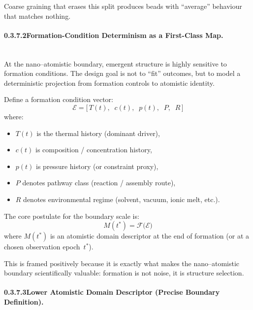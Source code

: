 \documentclass[11pt, a4paper, oneside]{article}
\theoremstyle{definition}
\theoremstyle{remark}
\begin{document}
\noindent
Coarse graining that erases this split produces beads with
``average'' behaviour that matches nothing.

\paragraph{0.3.7.2\quad Formation-Condition Determinism as a
  First-Class Map.}
\label{sec:formation-determinism}
\mbox{}\\[0.4em]

At the nano–atomistic boundary, emergent structure is highly sensitive to
formation conditions.  The design goal is not to ``fit'' outcomes,
but to model a deterministic projection from formation controls to
atomistic identity.

Define a formation condition vector:
\begin{equation}
  \mathcal{E} =
  \bigl[\,
    T(t),\;\;
    c(t),\;\;
    p(t),\;\;
    P,\;\;
    R
  \,\bigr]
  \label{eq:formation-conditions}
\end{equation}
where:
\begin{itemize}
  \item $T(t)$ is the thermal history (dominant driver),
  \item $c(t)$ is composition / concentration history,
  \item $p(t)$ is pressure history (or constraint proxy),
  \item $P$ denotes pathway class (reaction / assembly route),
  \item $R$ denotes environmental regime (solvent, vacuum, ionic
        melt, etc.).
\end{itemize}

The core postulate for the boundary scale is:
\begin{equation}
  \boxed{\;
    M(t^{*}) = \mathcal{F}\!\bigl(\mathcal{E}\bigr)
  \;}
  \label{eq:formation-map}
\end{equation}
where $M(t^{*})$ is an atomistic domain descriptor at the end of formation
(or at a chosen observation epoch~$t^{*}$).

This is framed positively because it is exactly what makes the
nano–atomistic boundary scientifically valuable: formation is not noise,
it is structure selection.

\paragraph{0.3.7.3\quad Lower Atomistic Domain Descriptor (Precise Boundary
  Definition).}
\label{sec:lower-atomistic}
\mbox{}\\[0.4em]
\end{document}
